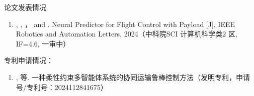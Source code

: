 \documentclass[lang=chs, degree=master, blindreview=false, winfonts=true]{yanputhesis}
\begin{document}
\begin{accomplishments}                                     %
	论文发表情况
	\begin{enumerate}
		\item {}, , ，  and . Neural Predictor for Flight Control with Payload [J].  IEEE Robotics
		and Automation Letters, 2024（中科院SCI 计算机科学类2 区, IF=4.6, 一审中）
	\end{enumerate}

    专利申请情况：
    \begin{enumerate}
    	\item {}, 等. 一种柔性约束多智能体系统的协同运输鲁棒控制方法（发明专利，申请号/专利号：2024112841675）
    \end{enumerate}
\end{accomplishments}                                       %
\makestatement                                              %
\end{document}
